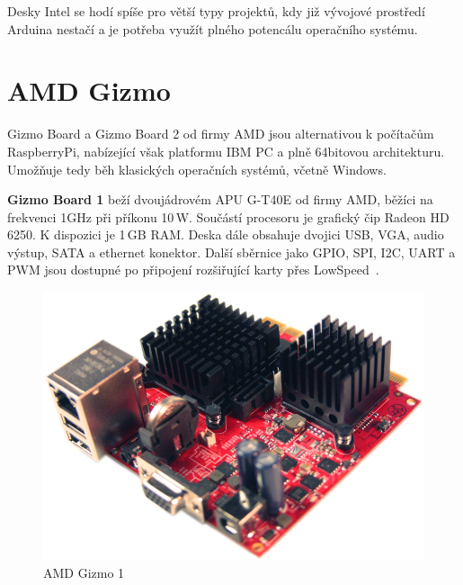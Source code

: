 Desky Intel se hodí spíše pro větší typy projektů, kdy již vývojové prostředí Arduina nestačí a je potřeba využít plného potencálu operačního systému.


 \section{AMD Gizmo}
\label{KapAMD}

	Gizmo Board a Gizmo Board 2 od firmy AMD jsou alternativou k počítačům RaspberryPi, nabízející však platformu IBM PC a plně 64bitovou architekturu. Umožňuje tedy běh klasických operačních systémů, včetně Windows.
	
		\textbf{Gizmo Board 1} beží dvoujádrovém APU G-T40E od firmy AMD, běžíci na frekvenci 1GHz při příkonu 10\,W. Součástí procesoru je grafický čip Radeon HD 6250. K dispozici je 1\,GB RAM. Deska dále obsahuje dvojici USB, VGA, audio výstup, SATA a ethernet konektor. Další sběrnice jako GPIO, SPI, I2C, UART a PWM jsou dostupné po připojení rozšiřující karty přes LowSpeed~\cite{AmdGizmo1}.
	
				\begin{figure}[!h]
 \begin{center}
    \includegraphics[scale=0.3]{obrazky/embed_amd_gizmo1}
  \end{center}
  \caption{AMD Gizmo 1~\cite{AmdGizmo1}}
\end{figure}

